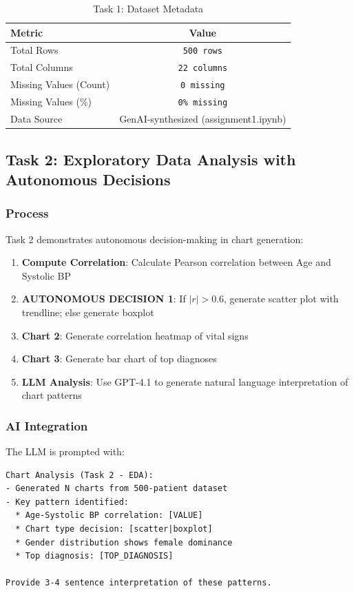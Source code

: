\documentclass[10pt,a4paper]{article}
\begin{document}
\begin{table}[h]
    \centering
    \caption{Task 1: Dataset Metadata}
    \begin{tabular}{|l|c|}
        \hline
        \textbf{Metric} & \textbf{Value} \\
        \hline
        Total Rows & \texttt{500 rows} \\
        Total Columns & \texttt{22 columns} \\
        Missing Values (Count) & \texttt{0 missing} \\
        Missing Values (\%) & \texttt{0\% missing} \\
        Data Source & GenAI-synthesized (assignment1.ipynb) \\
        \hline
    \end{tabular}
\end{table}

\subsection{Task 2: Exploratory Data Analysis with Autonomous Decisions}

\subsubsection{Process}

Task 2 demonstrates autonomous decision-making in chart generation:

\begin{enumerate}
    \item \textbf{Compute Correlation}: Calculate Pearson correlation between Age and Systolic BP
    \item \textbf{AUTONOMOUS DECISION 1}: If $|r| > 0.6$, generate scatter plot with trendline; else generate boxplot
    \item \textbf{Chart 2}: Generate correlation heatmap of vital signs
    \item \textbf{Chart 3}: Generate bar chart of top diagnoses
    \item \textbf{LLM Analysis}: Use GPT-4.1 to generate natural language interpretation of chart patterns
\end{enumerate}

\subsubsection{AI Integration}

The LLM is prompted with:
\begin{verbatim}
Chart Analysis (Task 2 - EDA):
- Generated N charts from 500-patient dataset
- Key pattern identified:
  * Age-Systolic BP correlation: [VALUE]
  * Chart type decision: [scatter|boxplot]
  * Gender distribution shows female dominance
  * Top diagnosis: [TOP_DIAGNOSIS]

Provide 3-4 sentence interpretation of these patterns.
\end{verbatim}
\end{document}

